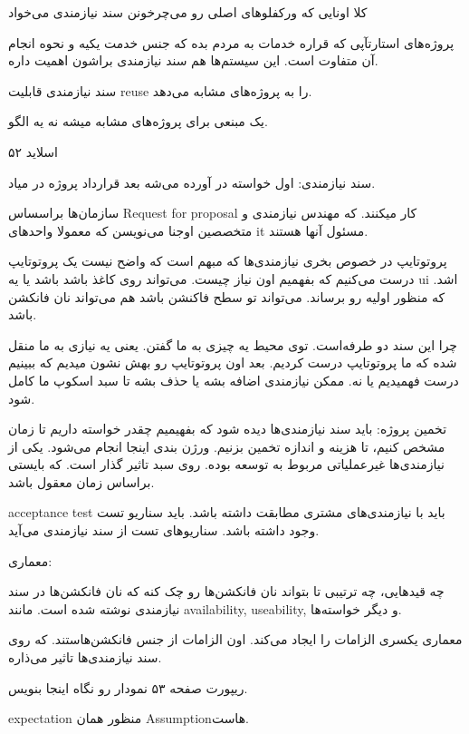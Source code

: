 کلا اونایی که ورکفلو‌های اصلی رو می‌چرخونن سند نیازمندی می‌خواد

پروژه‌های استارتآپی که قراره خدمات به مردم بده که جنس خدمت یکیه و نحوه انجام آن
متفاوت است. این سیستم‌ها هم سند نیازمندی براشون اهمیت داره.

سند نیازمندی قابلیت reuse را به پروژه‌های مشابه می‌دهد.

یک مبنعی برای پروژه‌های مشابه میشه نه یه الگو.

اسلاید ۵۲

سند نیازمندی: اول خواسته در آورده می‌شه بعد قرارداد پروژه در میاد.

سازمان‌ها براسساس Request for proposal کار میکنند. که مهندس نیازمندی و متخصصین
اوجنا می‌نویسن که معمولا واحد‌های it مسئول آنها هستند.

پروتوتایپ در خصوص بخری نیازمندی‌ها که مبهم است که واضح نیست یک پروتوتایپ درست
می‌کنیم که بفهمیم اون نیاز چیست. می‌تواند روی کاغذ باشد باشد یا یه ui اشد. که
منظور اولیه رو برساند. می‌تواند تو سطح فاکنشن باشد هم می‌تواند نان فانکشن باشد.

چرا این سند دو طرفه‌است. توی محیط یه چیزی به ما گفتن. یعنی یه نیازی به ما منقل
شده که ما پروتوتایپ درست کردیم. بعد اون پروتوتایپ رو بهش نشون میدیم که ببینیم
درست فهمیدیم یا نه. ممکن نیازمندی اضافه بشه یا حذف بشه تا سبد اسکوپ ما کامل شود.

تخمین پروژه: باید سند نیازمندی‌ها دیده شود که بفهیمیم چقدر خواسته داریم تا زمان
مشخص کنیم، تا هزینه و اندازه تخمین بزنیم. ورژن بندی اینجا انجام می‌شود. یکی از
نیازمندی‌ها غیرعملیاتی مربوط به توسعه بوده. روی سبد تاثیر گذار است. که بایستی
براساس زمان معقول باشد.

acceptance test باید با نیازمندی‌های مشتری مطابقت داشته باشد. باید سناریو تست
وجود داشته باشد. سناریو‌های تست از سند نیازمندی می‌آید.

معماری:

چه قید‌هایی، چه ترتیبی تا بتواند نان فانکشن‌ها رو چک کنه که نان فانکشن‌ها در سند
نیازمندی نوشته شده است. مانند availability, useability, و دیگر خواسته‌ها.

معماری یکسری الزامات را ایجاد می‌کند. اون الزامات از جنس فانکشن‌هاستند. که روی
سند نیازمندی‌ها تاثیر می‌ذاره.

ریپورت صفحه ۵۳ نمودار رو نگاه اینجا بنویس.

expectation منظور همان Assumptionهاست.